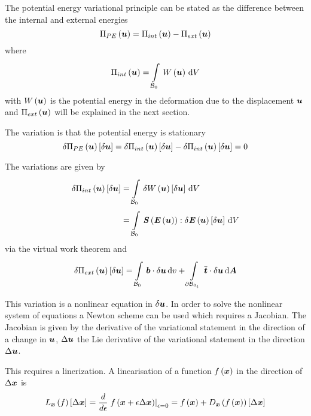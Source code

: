 The potential energy variational principle can be stated as the difference
between the internal and external energies \ie
\begin{equation}
   \Pi_{PE}\left(  \boldsymbol{u}  \right) = \Pi_{int}\left(  \boldsymbol{u}  \right) - \Pi_{ext}\left(  \boldsymbol{u}  \right) 
\end{equation}
where
\begin{equation}
  \fnof{\Pi_{int}}{\vectr{u}}=\gint{\embedmanifold{B}_{0}}{}{\fnof{W}{\vectr{u}}}{V}
\end{equation}
with $ W\left(  \boldsymbol{u}  \right) $ is the potential energy in the deformation due to
the displacement $ \boldsymbol{u} $ and $ \Pi_{ext}\left(  \boldsymbol{u}  \right) $ will be
explained in the next section.

The variation is that the potential energy is stationary \ie
\begin{equation}
     \delta   \Pi_{PE}\left(  \boldsymbol{u}  \right) \left[   \delta   \boldsymbol{u}   \right]  =   \delta   \Pi_{int}\left(  \boldsymbol{u}  \right) \left[   \delta   \boldsymbol{u}   \right]  -   \delta   \Pi_{int}\left(  \boldsymbol{u}  \right) \left[   \delta   \boldsymbol{u}   \right]  =0
\end{equation}

The variations are given by 
\begin{equation}
  \begin{split}
    \variation{\fnof{\Pi_{int}}{\vectr{u}}}{\vectr{u}}&=\gint{\embedmanifold{B}_{0}}{}{\variation{\fnof{W}{\vectr{u}}}{\vectr{u}}}{V}
    \\
    &=\gint{\embedmanifold{B}_{0}}{}{\doubledotprod{\fnof{\tensor{S}}{\fnof{\tensor{E}}{\vectr{u}}}}{\variation{\fnof{\tensor{E}}{\vectr{u}}}{\vectr{u}}}}{V}
  \end{split}
\end{equation}
via the virtual work theorem and
\begin{equation}
  \variation{\fnof{\Pi_{ext}}{\vectr{u}}}{\vectr{u}}=\gint{\embedmanifold{B}_{0}}{}{\dotprod{\vectr{b}}{\variationdir{\vectr{u}}}}{v}+\gint{\boundary{\embedmanifold{B}}_{0_{t}}}{}{\dotprod{\bar{\vectr{t}}}{\variationdir{\vectr{u}}}}{\covectr{A}}
\end{equation}

This variation is a nonlinear equation in $  \delta   \boldsymbol{u}  $. In order to
solve the nonlinear system of equations a Newton scheme can be used which
requires a Jacobian. The Jacobian is given by the derivative of the
variational statement in the direction of a change in $ \boldsymbol{u} $,
$  \Delta   \boldsymbol{u}  $ \ie the Lie derivative of the variational statement in the
direction $  \Delta   \boldsymbol{u}  $.

This requires a linerization. A linearisation of a function
$ f\left(  \boldsymbol{x}  \right) $ in the direction of $  \Delta   \boldsymbol{x}  $ is
\begin{equation}
  \linearisation{f}{\vectr{x}}{\vectr{x}}=\dby{}{\epsilon}\evalat{\fnof{f}{\vectr{x}+\epsilon\linearisationdir{\vectr{x}}}}{\epsilon=0}=\fnof{f}{\vectr{x}}+\directionalderiv{\vectr{x}}{\fnof{f}{\vectr{x}}}{\linearisationdir{\vectr{x}}}
\end{equation}

